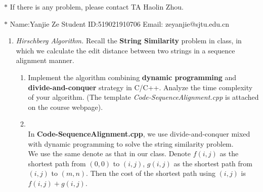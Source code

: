 \documentclass[12pt,a4paper]{article}
\makeatletter
\newtheorem*{solution}{Solution}
\theoremstyle{definition}
\renewenvironment{solution}[1][Solution] {\par\pushQED{\qed}\normalfont\topsep6\p@\@plus6\p@\relax\trivlist\item[\hskip\labelsep\bfseries#1\@addpunct{.}]\ignorespaces}{\popQED\endtrivlist\@endpefalse} \makeatother
\makeatother
\begin{document}
\noindent

\noindent{}
\begin{center}
\footnotesize{\color{red}$*$ If there is any problem, please contact TA Haolin Zhou.}

\footnotesize{\color{blue}$*$ Name:Yanjie Ze  \quad Student ID:519021910706 \quad Email: zeyanjie@sjtu.edu.cn}
\end{center}

\begin{enumerate}
    \item
    \textit{Hirschberg Algorithm.} Recall the \textbf{String Similarity} problem in class, in which we calculate the edit distance between two strings in a sequence alignment manner.
    \begin{enumerate}
    	\item
    	Implement the algorithm combining \textbf{dynamic programming} and \textbf{divide-and-conquer} strategy in C/C++. Analyze the time complexity of your algorithm. {\color{blue}(The template \emph{Code-SequenceAlignment.cpp} is attached on the course webpage)}.
    	\begin{solution}
    	~\\
    	In \textbf{Code-SequenceAlignment.cpp}, we use divide-and-conquer mixed with dynamic programming to solve the string similarity problem.
    	~\\
    	
    	We use the same denote as that in our class. Denote $f(i,j)$ as the shortest path from $(0,0)$ to $(i,j)$, $g(i,j)$ as the shortest path from $(i,j)$ to $(m,n)$. Then the cost of the shortest path using $(i,j)$ is $f(i,j)+g(i,j)$.
    	

\end{solution}
\end{enumerate}
\end{enumerate}
\end{document}

